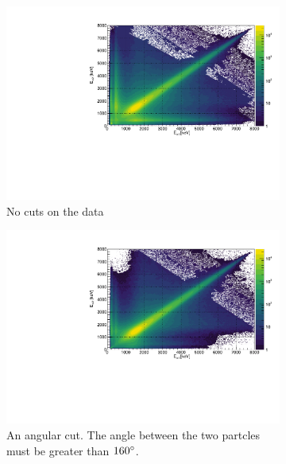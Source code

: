 \begin{figure}[H]
	\begin{subfigure}[t]{0.5\linewidth}
		\includegraphics[width=\linewidth]{../figures/EENoCuts.pdf}
		\caption{No cuts on the data}
		\label{fig:EENoCuts}
	\end{subfigure}
	\begin{subfigure}[t]{0.5\linewidth}
		\includegraphics[width=\linewidth]{../figures/EEAngleCut.pdf}
		\caption{An angular cut. The angle between the two partcles must be greater than $160\degree$.}
		\label{fig:EEAngleCut}
	\end{subfigure}
	\begin{subfigure}[t]{0.5\linewidth}

\end{subfigure}
\end{figure}
